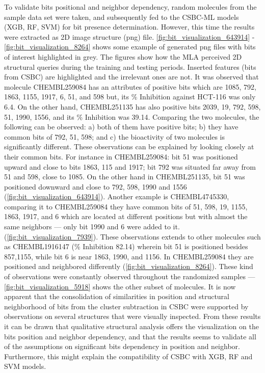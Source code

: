 To validate bits positional and neighbor dependency, random molecules from the sample data set were taken, and subsequently fed to the CSBC-ML models (XGB, RF, SVM) for bit presence determination. However, this time the results were extracted as 2D image structure (png) file. \autoref{fig:bit_visualization_643914} - \ref{fig:bit_visualization_8264} shows some example of generated png files with bits of interest highlighted in grey. The figures show how the MLA perceived 2D structural queries during the training and testing periods. Inserted features (bits from CSBC) are highlighted and the irrelevant ones are not. It was observed that molecule CHEMBL259084 has an attributes of positive bits which are 1085, 792, 1863, 1155, 1917, 6, 51, and 598  but, its \% Inhibition against HCT-116 was only 6.4. On the other hand, CHEMBL251135 has also positive bits 2039, 19, 792, 598, 51, 1990, 1556, and its \% Inhibition was 39.14. Comparing the two molecules, the following can be observed: a) both of them have positive bits; b) they have common bits of 792, 51, 598; and c) the bioactivity of two molecules is significantly different. These observations can be explained by looking closely at their common bits. For instance in CHEMBL259084: bit 51 was positioned upward and close to bits 1863, 115 and 1917; bit 792 was situated far away from 51 and 598, close to 1085. On the other hand in CHEMBL251135, bit 51 was positioned downward and  close to 792, 598, 1990 and 1556 (\autoref{fig:bit_visualization_643914}). Another example is CHEMBL4745330,  %
comparing it to CHEMBL259084 they have common bits of 51, 598, 19, 1155, 1863, 1917, and 6 which are located at different positions but with almost the same neighbors --- only bit 1990 and 6 were added to it. (\autoref{fig:bit_visualization_7939}). These observations extends to other molecules such as CHEMBL1916147 (\% Inhibition 82.14) wherein bit 51 is positioned besides 857,1155, while bit 6 is near 1863, 1990, and 1156. In CHEMBL259084 they are positioned and neighbored differently (\autoref{fig:bit_visualization_8264}). These kind of observations were constantly observed throughout the randomized samples ---  \autoref{fig:bit_visualization_5918} shows the other subset of molecules. It is now apparent that the consolidation of similarities in position and structural neighborhood of bits from the cluster subtraction in CSBC were supported by observations on several structures that were visually inspected. From these results it can be drawn that qualitative structural analysis offers the visualization on the bits position and neighbor dependency, and that the results seems to validate all of the assumptions on significant bits dependency in position and neighbor. Furthermore, this might explain the compatibility of CSBC with XGB, RF and SVM models.
 
